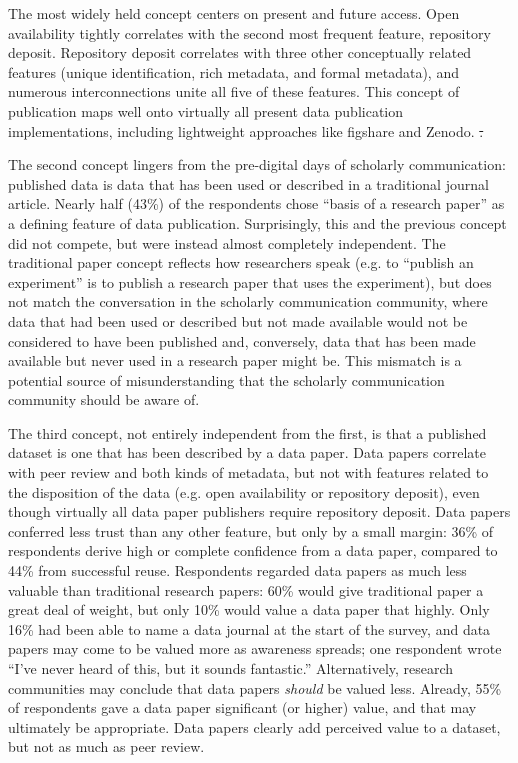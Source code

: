 \documentclass[10pt]{article}
\providecommand{\DIFdeltex}[1]{{\protect\color{red}\sout{#1}}}                      %
\providecommand{\DIFdelbegin}{} %
\providecommand{\DIFdelend}{} %
\providecommand{\DIFdel}[1]{\texorpdfstring{\DIFdeltex{#1}}{}} %
\begin{document}
The most widely held concept centers on present and future access.
Open availability tightly correlates with the second most frequent feature, repository deposit.
Repository deposit correlates with three other conceptually related features (unique identification, rich metadata, and formal metadata), and numerous interconnections unite all five of these features.
This concept of publication maps well onto virtually all present data publication implementations, including lightweight approaches like figshare and Zenodo.
\DIFdelbegin \DIFdel{.
}\DIFdelend 

The second concept lingers from the pre-digital days of scholarly communication: published data is data that has been used or described in a traditional journal article. 
Nearly half (43\%) of the respondents chose ``basis of a research paper'' as a defining feature of data publication. 
Surprisingly, this and the previous concept did not compete, but were instead almost completely independent.
The traditional paper concept reflects how researchers speak (e.g. to ``publish an experiment'' is to publish a research paper that uses the experiment), but does not match the conversation in the scholarly communication community, where data that had been used or described but not made available would not be considered to have been published and, conversely, data that has been made available but never used in a research paper might be.
This mismatch is a potential source of misunderstanding that the scholarly communication community should be aware of.

The third concept, not entirely independent from the first, is that a published dataset is one that has been described by a data paper.
Data papers correlate with peer review and both kinds of metadata, but not with features related to the disposition of the data (e.g. open availability or repository deposit), even though virtually all data paper publishers require repository deposit.
Data papers conferred less trust than any other feature, but only by a small margin: 36\% of respondents derive high or complete confidence from a data paper, compared to 44\% from successful reuse.
Respondents regarded data papers as much less valuable than traditional research papers: 60\% would give traditional paper a great deal of weight, but only 10\% would value a data paper that highly. 
Only 16\% had been able to name a data journal at the start of the survey, and data papers may come to be valued more as awareness spreads; one respondent wrote ``I've never heard of this, but it sounds fantastic.''
Alternatively, research communities may conclude that data papers \textit{should} be valued less.
Already, 55\% of respondents gave a data paper significant (or higher) value, and that may ultimately be appropriate.
Data papers clearly add perceived value to a dataset, but not as much as peer review.
\end{document}
